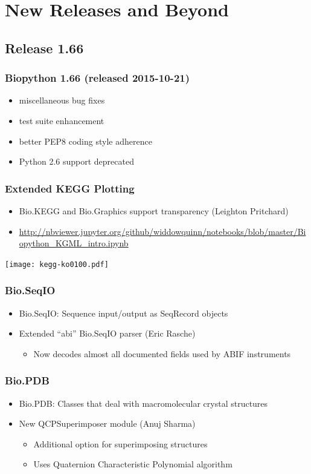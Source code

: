 \documentclass[trans]{beamer}
\begin{document}

\section{New Releases and Beyond}
\subsection*{Release 1.66}
\frame
{
  \frametitle{Biopython 1.66 (released 2015-10-21)}

  \begin{itemize}
  \item miscellaneous bug fixes
  \item test suite enhancement
  \item better PEP8 coding style adherence
  \item Python 2.6 support deprecated
  \end{itemize}
}

\frame
{
  \frametitle{Extended KEGG Plotting}
  
  \begin{itemize}
  \item Bio.KEGG and Bio.Graphics support transparency (Leighton Pritchard)
  \item \url{http://nbviewer.jupyter.org/github/widdowquinn/notebooks/blob/master/Biopython_KGML_intro.ipynb}
  \end{itemize}
  
  \begin{center}
  \texttt{[image: kegg-ko0100.pdf]}
  \end{center}
}

\frame
{
  \frametitle{Bio.SeqIO}
  
  \begin{itemize}
  \item Bio.SeqIO: Sequence input/output as SeqRecord objects  
  \item Extended ``abi'' Bio.SeqIO parser (Eric Rasche)
  \begin{itemize}
  \item Now decodes almost all documented fields used by ABIF instruments
  \end{itemize}
  \end{itemize}
}

\frame
{
  \frametitle{Bio.PDB}
  
  \begin{itemize}
  \item Bio.PDB: Classes that deal with macromolecular crystal structures  
  \item New QCPSuperimposer module (Anuj Sharma)
  \begin{itemize}
  \item Additional option for superimposing structures
  \item Uses Quaternion Characteristic Polynomial algorithm
  \end{itemize}
  \end{itemize}
}
\end{document}
